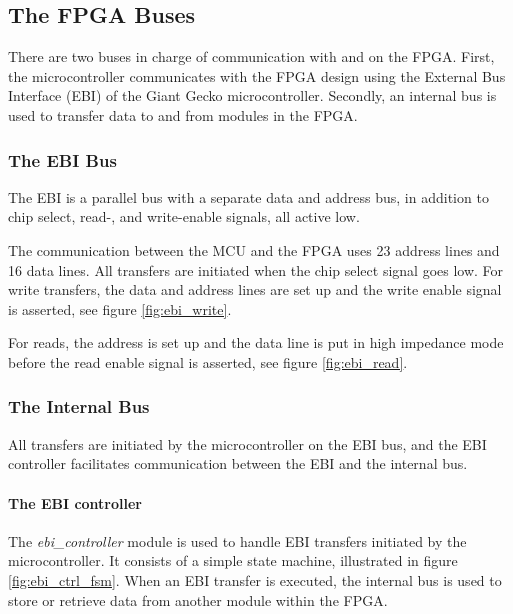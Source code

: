 \FloatBarrier
\subsection{The FPGA Buses}\label{section:fpga-buses}

There are two buses in charge of communication with and on the FPGA. First, the
microcontroller communicates with the FPGA design using the External Bus
Interface (EBI) of the Giant Gecko microcontroller. Secondly, an internal bus is
used to transfer data to and from modules in the FPGA.

\subsubsection{The EBI Bus}
The EBI\cite{efm_ebi} is a parallel bus with a separate data and address bus, in
addition to chip select, read-, and write-enable signals, all active low.

The communication between the MCU and the FPGA uses 23 address lines and 16 data
lines. All transfers are initiated when the chip select signal goes low. For
write transfers, the data and address lines are set up and the write enable
signal is asserted, see figure \ref{fig:ebi_write}.

For reads, the address is set up and the data line is put in high impedance mode
before the read enable signal is asserted, see figure \ref{fig:ebi_read}.




\FloatBarrier
\subsubsection{The Internal Bus}

All transfers are initiated by the microcontroller on the EBI bus, and the EBI
controller facilitates communication between the EBI and the internal bus.

\paragraph{The EBI controller}
The \emph{ebi_controller} module is used to handle EBI transfers initiated by
the microcontroller. It consists of a simple state machine, illustrated in
figure \ref{fig:ebi_ctrl_fsm}. When an EBI transfer is executed, the internal
bus is used to store or retrieve data from another module within the FPGA.


